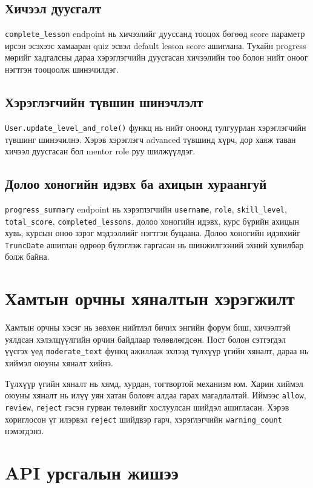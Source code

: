 \subsection{Хичээл дуусгалт}
\texttt{complete\_lesson} endpoint нь хичээлийг дууссанд тооцох бөгөөд score параметр ирсэн эсэхээс хамааран quiz эсвэл default lesson score ашиглана. Тухайн progress мөрийг хадгалсны дараа хэрэглэгчийн дуусгасан хичээлийн тоо болон нийт оноог нэгтгэн тооцоолж шинэчилдэг.

\subsection{Хэрэглэгчийн түвшин шинэчлэлт}
\texttt{User.update\_level\_and\_role()} функц нь нийт оноонд тулгуурлан хэрэглэгчийн түвшинг шинэчилнэ. Хэрэв хэрэглэгч advanced түвшинд хүрч, дор хаяж таван хичээл дуусгасан бол mentor role руу шилжүүлдэг.

\subsection{Долоо хоногийн идэвх ба ахицын хураангуй}
\texttt{progress\_summary} endpoint нь хэрэглэгчийн \texttt{username}, \texttt{role}, \texttt{skill\_level}, \texttt{total\_score}, \texttt{completed\_lessons}, долоо хоногийн идэвх, курс бүрийн ахицын хувь, курсын оноо зэрэг мэдээллийг нэгтгэн буцаана. Долоо хоногийн идэвхийг \texttt{TruncDate} ашиглан өдрөөр бүлэглэж гаргасан нь шинжилгээний эхний хувилбар болж байна.

\section{Хамтын орчны хяналтын хэрэгжилт}
Хамтын орчны хэсэг нь зөвхөн нийтлэл бичих энгийн форум биш, хичээлтэй уялдсан хэлэлцүүлгийн орчин байдлаар төлөвлөгдсөн. Пост болон сэтгэгдэл үүсгэх үед \texttt{moderate\_text} функц ажиллаж эхлээд түлхүүр үгийн хяналт, дараа нь хиймэл оюуны хяналт хийнэ.

Түлхүүр үгийн хяналт нь хямд, хурдан, тогтвортой механизм юм. Харин хиймэл оюуны хяналт нь илүү уян хатан боловч алдаа гарах магадлалтай. Иймээс \texttt{allow}, \texttt{review}, \texttt{reject} гэсэн гурван төлөвийг хослуулсан шийдэл ашигласан. Хэрэв хориглосон үг илэрвэл \texttt{reject} шийдвэр гарч, хэрэглэгчийн \texttt{warning\_count} нэмэгдэнэ.

\section{API урсгалын жишээ}
